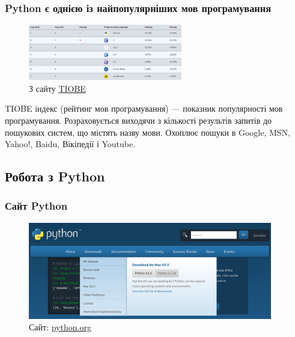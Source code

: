 \begin{frame}
\frametitle{Python є однією із найпопулярніших мов програмування}
\begin{figure}
\begin{center}
 \includegraphics[width=0.6\textwidth]{pictures/tiobe.png}
\caption{З сайту \href{https://www.tiobe.com/tiobe-index/}{TIOBE}}
\label{python_site} 
\end{center}
\end{figure}
\tiny{TIOBE індекс (рейтинг мов програмування) — показник популярності мов програмування. Розраховується виходячи з кількості результів запитів до пошукових систем, що містять назву мови. Охоплює пошуки в Google, MSN, Yahoo!, Baidu, Вікіпедії і Youtube.}
\end{frame}



\subsection{Робота з Python}
\begin{frame}
\frametitle{Сайт Python}
\begin{figure}
\begin{center}
 \includegraphics[width=0.95\textwidth]{pictures/python_site.png}
\caption{Сайт: \href{https://python.org/}{python.org}}
\label{python_site} 
\end{center}
\end{figure}

\end{frame}

